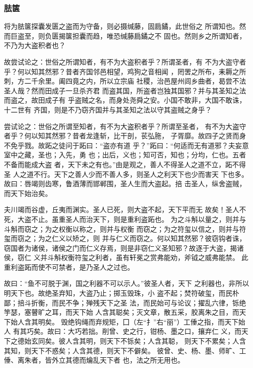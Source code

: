 \documentclass[]{article}
\begin{document}
\hypertarget{header-n2110}{%
\subsubsection{胠箧}\label{header-n2110}}

将为胠箧探囊发匮之盗而为守备，则必摄缄藤，固扃鐍，此世俗之
所谓知也。然而巨盗至，则负匮揭箧担囊而趋，唯恐缄藤扃鐍之不
固也。然则乡之所谓知者，不乃为大盗积者也？

故尝试论之：世俗之所谓知者，有不为大盗积者乎？所谓圣者，有
不为大盗守者乎？何以知其然邪？昔者齐国邻邑相望，鸡狗之音相闻
，罔罟之所布，耒耨之所刺，方二千余里。阖四竟之内，所以立宗庙
社稷，治邑屋州闾乡曲者，曷尝不法圣人哉？然而田成子一旦杀齐君
而盗其国，所盗者岂独其国邪？并与其圣知之法而盗之，故田成子有
乎盗贼之名，而身处尧舜之安。小国不敢非，大国不敢诛，十二世有
齐国，则是不乃窃齐国并与其圣知之法以守其盗贼之身乎？

尝试论之：世俗之所谓至知者，有不为大盗积者乎？所谓至圣者，
有不为大盗守者乎？何以知其然邪？昔者龙逢斩，比干剖，苌弘胣，
子胥靡。故四子之贤而身不免乎戮。故跖之徒问于跖曰：``盗亦有道
乎？''跖曰：``何适而无有道邪？夫妄意室中之藏，圣也；入先，勇
也；出后，义也；知可否，知也；分均，仁也。五者不备而能成大盗
者，天下未之有也。''由是观之，善人不得圣人之道不立，跖不得圣
人之道不行。天下之善人少而不善人多，则圣人之利天下也少而害天
下也多。故曰：唇竭则齿寒，鲁酒薄而邯郸围，圣人生而大盗起。掊
击圣人，纵舍盗贼，而天下始治矣。

夫川竭而谷虚，丘夷而渊实。圣人已死，则大盗不起，天下平而无
故矣！圣人不死，大盗不止。虽重圣人而治天下，则是重利盗跖也。
为之斗斛以量之，则并与斗斛而窃之；为之权衡以称之，则并与权衡
而窃之；为之符玺以信之，则并与符玺而窃之；为之仁义以矫之，则
并与仁义而窃之。何以知其然邪？彼窃钩者诛，窃国者为诸侯，诸侯之门而仁义存焉，则是非窃仁义圣知邪？故逐于大盗，揭诸侯，窃仁
义并斗斛权衡符玺之利者，虽有轩冕之赏弗能劝，斧钺之威弗能禁。
此重利盗跖而使不可禁者，是乃圣人之过也。

故曰：``鱼不可脱于渊，国之利器不可以示人。''彼圣人者，天下
之利器也，非所以明天下也。故绝圣弃知，大盗乃止；掷玉毁珠，小
盗不起；焚符破玺，而民朴鄙；掊斗折衡，而民不争；殚残天下之圣
法，而民始可与论议；擢乱六律，铄绝竽瑟，塞瞽旷之耳，而天下始
人含其聪矣；灭文章，散五采，胶离朱之目，而天下始人含其明矣。
毁绝钩绳而弃规矩，囗（左``扌''右``丽''）工倕之指，而天下始人
有其巧矣。故曰：大巧若拙。削曾、史之行，钳杨、墨之口，攘弃仁
义，而天下之德始玄同矣。彼人含其明，则天下不铄矣；人含其聪，
则天下不累矣；人含其知，则天下不惑矣；人含其德，则天下不僻矣。
彼曾、史、杨、墨、师旷、工倕、离朱者，皆外立其德而爚乱天下者
也，法之所无用也。
\end{document}
